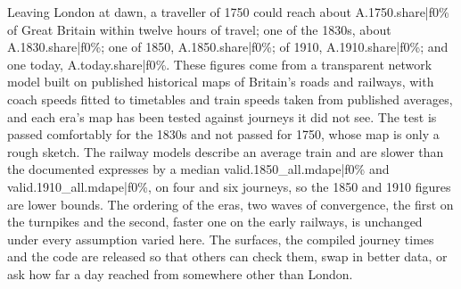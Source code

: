Leaving London at dawn, a traveller of 1750 could reach about {{A.1750.share|f0}}\% of Great Britain within twelve hours of travel; one of the 1830s, about {{A.1830.share|f0}}\%; one of 1850, {{A.1850.share|f0}}\%; of 1910, {{A.1910.share|f0}}\%; and one today, {{A.today.share|f0}}\%. These figures come from a transparent network model built on published historical maps of Britain's roads and railways, with coach speeds fitted to timetables and train speeds taken from published averages, and each era's map has been tested against journeys it did not see. The test is passed comfortably for the 1830s and not passed for 1750, whose map is only a rough sketch. The railway models describe an average train and are slower than the documented expresses by a median {{valid.1850_all.mdape|f0}}\% and {{valid.1910_all.mdape|f0}}\%, on four and six journeys, so the 1850 and 1910 figures are lower bounds. The ordering of the eras, two waves of convergence, the first on the turnpikes and the second, faster one on the early railways, is unchanged under every assumption varied here. The surfaces, the compiled journey times and the code are released so that others can check them, swap in better data, or ask how far a day reached from somewhere other than London.
